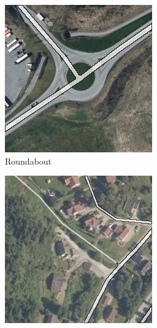 \begin{figure}[h]
\begin{subfigure}{0.31\textwidth}
\includegraphics[width=\linewidth]{figs/datasets/nor_examples/1177_roundabout_n50.png}
\caption{Roundabout} \label{fig:norwegian_roads_roundabout_n50}
\end{subfigure}
\hspace*{\fill} %
\begin{subfigure}{0.31\textwidth}
\includegraphics[width=\linewidth]{figs/datasets/nor_examples/1157_missing_n50.png}

\end{subfigure}
\end{figure}
